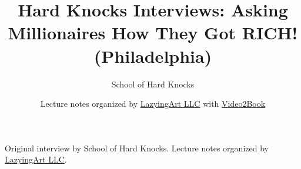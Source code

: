 \documentclass[11pt,oneside]{book}
\begin{document}
\frontmatter
\title{Hard Knocks Interviews: Asking Millionaires How They Got RICH! (Philadelphia)}
\author{School of Hard Knocks}
\date{Lecture notes organized by \href{https://lazying.art}{LazyingArt LLC} with \href{https://github.com/lachlanchen/Video2Book}{Video2Book}}
\maketitle
\begin{center}
\small Original interview by School of Hard Knocks. Lecture notes organized by \href{https://lazying.art}{LazyingArt LLC}.
\end{center}
\clearpage
\mainmatter

\end{document}
